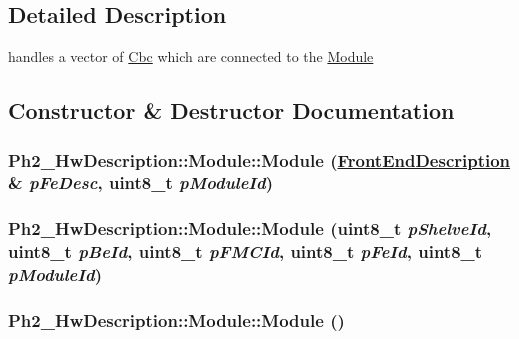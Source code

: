 \subsection{Detailed Description}
handles a vector of \hyperlink{class_ph2___hw_description_1_1_cbc}{Cbc} which are connected to the \hyperlink{class_ph2___hw_description_1_1_module}{Module} 



\subsection{Constructor \& Destructor Documentation}
\hypertarget{class_ph2___hw_description_1_1_module_8e5a7e697a51121a0a701c61f319b5e9}{
\subsubsection[Module]{\setlength{\rightskip}{0pt plus 5cm}Ph2\_\-Hw\-Description::Module::Module (\hyperlink{class_ph2___hw_description_1_1_front_end_description}{Front\-End\-Description} \& {\em p\-Fe\-Desc}, uint8\_\-t {\em p\-Module\-Id})}}
\label{class_ph2___hw_description_1_1_module_8e5a7e697a51121a0a701c61f319b5e9}


\hypertarget{class_ph2___hw_description_1_1_module_cb5e5f17c946438f985c209563060f26}{
\subsubsection[Module]{\setlength{\rightskip}{0pt plus 5cm}Ph2\_\-Hw\-Description::Module::Module (uint8\_\-t {\em p\-Shelve\-Id}, uint8\_\-t {\em p\-Be\-Id}, uint8\_\-t {\em p\-FMCId}, uint8\_\-t {\em p\-Fe\-Id}, uint8\_\-t {\em p\-Module\-Id})}}
\label{class_ph2___hw_description_1_1_module_cb5e5f17c946438f985c209563060f26}


\hypertarget{class_ph2___hw_description_1_1_module_aec7dd439bdf7a1db3f2136569a00125}{
\subsubsection[Module]{\setlength{\rightskip}{0pt plus 5cm}Ph2\_\-Hw\-Description::Module::Module ()}}
\label{class_ph2___hw_description_1_1_module_aec7dd439bdf7a1db3f2136569a00125}


